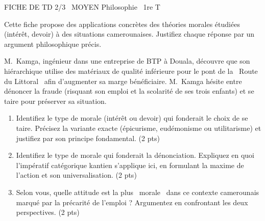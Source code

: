 \documentclass[11pt]{article}
\begin{document}
\begin{tcolorbox}[enhanced,colback=popink,colframe=popink,arc=10pt,boxrule=0pt,left=12pt,right=12pt,top=9pt,bottom=9pt]
{\color{white}\popxbold\small FICHE DE TD 2/3 \textbullet\ MOYEN \hfill Philosophie \textbullet\ 1re T\par}
\end{tcolorbox}
\vspace{4pt}
\noindent Cette fiche propose des applications concrètes des théories morales étudiées (intérêt, devoir) à des situations camerounaises. Justifiez chaque réponse par un argument philosophique précis.

\begin{exercice}
M.~Kamga, ingénieur dans une entreprise de BTP à Douala, découvre que son hiérarchique utilise des matériaux de qualité inférieure pour le pont de la \og~Route du Littoral~\fg{} afin d'augmenter sa marge bénéficiaire. M.~Kamga hésite entre dénoncer la fraude (risquant son emploi et la scolarité de ses trois enfants) et se taire pour préserver sa situation.
\begin{enumerate}
    \item Identifiez le type de morale (intérêt ou devoir) qui fonderait le choix de se taire. Précisez la variante exacte (épicurisme, eudémonisme ou utilitarisme) et justifiez par son principe fondamental. (2 pts)
    \item Identifiez le type de morale qui fonderait la dénonciation. Expliquez en quoi l'impératif catégorique kantien s'applique ici, en formulant la maxime de l'action et son universalisation. (2 pts)
    \item Selon vous, quelle attitude est la plus \og~morale~\fg{} dans ce contexte camerounais marqué par la précarité de l'emploi ? Argumentez en confrontant les deux perspectives. (2 pts)
\end{enumerate}
\end{exercice}
\end{document}
